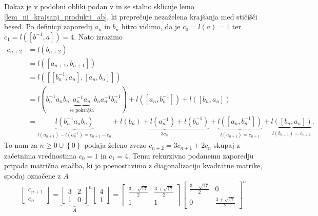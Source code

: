 \begin{dokaz}
    Dokaz je v podobni obliki podan v \cite[str.~15]{Schneider_2016} in se stalno sklicuje lemo \ref{lem_ni_krajsanj_produkti_ab}, ki preprečuje nezaželena krajšanja med stičišči besed. Po definicji zaporedij $a_n$ in $b_n$ hitro vidimo, da je $c_0 = l(a) = 1$ ter $c_1 = l([b^{-1}, a]) = 4$. Nato izrazimo
    \begin{align*}
        c_{n+2} &= l(b_{n+2}) \\
         &= l([a_{n + 1}, b_{n+1}])\\
         &= l([[b_n ^{-1}, a_{n}], [a_{n}, b_{n}]]) \\
         &= l(b_{n} ^{-1} a_{n} b_{n} \underbrace{a_{n} ^{-1} a_{n}}_{\text{se pokrajša}}  b_{n} a_{n} ^{-1} b_{n} ^{-1}) + l([a_{n}, b_{n} ^{-1}]) + l([b_{n}, a_{n}]) \\
         &= \underbrace{l(b_{n} ^{-1} a_{n} b_{n})}_{l(a_{n + 1}) - l(a_{n}^{-1}) = c_{n+1} - c_{n}}  + \underbrace{l(b_{n}) + l(a_{n} ^{-1}) + l(b_{n} ^{-1})}_{3 c_{n}}  + \underbrace{l([a_{n} , b_{n}^{-1}])}_{l(a_{n + 1}) = c_{n+1}}  + \underbrace{l([b_{n}, a_{n}])}_{l(b_{n+1}) = c_{n+1}}. 
    \end{align*}
    To nam za $n \ge 0 \cup  \left\{ 0 \right\}$ podaja želeno zvezo $c_{n+2} = 3 c_{n+1} + 2c_{n}$ skupaj z začetnima vrednostima $c_0 = 1$ in $c_1 = 4$. Temu rekurzivno podanemu zaporedju pripada matrična enačba, ki jo poenostavimo z diagonalizacijo kvadratne matrike, spodaj označene z $A$ \begin{equation*}
    \begin{bmatrix}
        c_{n+ 1}\\
        c_{n} 
    \end{bmatrix} = {\underbrace{\begin{bmatrix}
        3 & 2\\
        1 & 0
    \end{bmatrix}}_{A}}^{n}  \begin{bmatrix}
        4 \\
        1 
    \end{bmatrix} = \begin{bmatrix}
        \frac{3 - \sqrt{17} }{2} & \frac{3 + \sqrt{17} }{2}\\
        1 & 1
    \end{bmatrix} \begin{bmatrix}
        \frac{3 - \sqrt{17} }{2} & 0\\
        0 & \frac{3 + \sqrt{17} }{2}
    \end{bmatrix}^{n} 

\end{equation*}
\end{dokaz}
